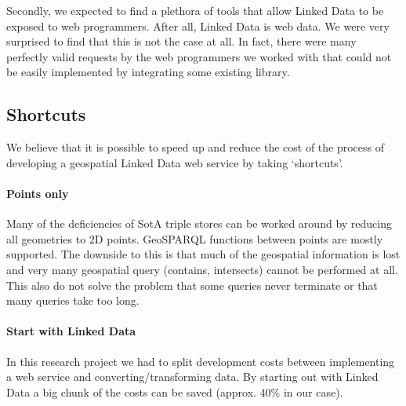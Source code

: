\documentclass[a4paper]{scrartcl}
\begin{document}
Secondly, we expected to find a plethora of tools that allow Linked
Data to be exposed to web programmers.  After all, Linked Data is web
data.  We were very surprised to find that this is not the case at
all.  In fact, there were many perfectly valid requests by the web
programmers we worked with that could not be easily implemented by
integrating some existing library.

\subsection{Shortcuts}

We believe that it is possible to speed up and reduce the cost of the
process of developing a geospatial Linked Data web service by taking
`shortcuts'.


\paragraph{Points only}

Many of the deficiencies of SotA triple stores can be worked around by
reducing all geometries to 2D points.  GeoSPARQL functions between
points are mostly supported.  The downside to this is that much of the
geospatial information is lost and very many geospatial query
(contains, intersects) cannot be performed at all.  This also do not
solve the problem that some queries never terminate or that many
queries take too long.


\paragraph{Start with Linked Data}

In this research project we had to split development costs between
implementing a web service and converting/transforming data.  By
starting out with Linked Data a big chunk of the costs can be saved
(approx. 40\% in our case).
\end{document}
